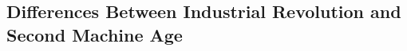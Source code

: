 \subsection{Differences Between  Industrial Revolution and Second Machine Age}
\label{sec:-differences}


